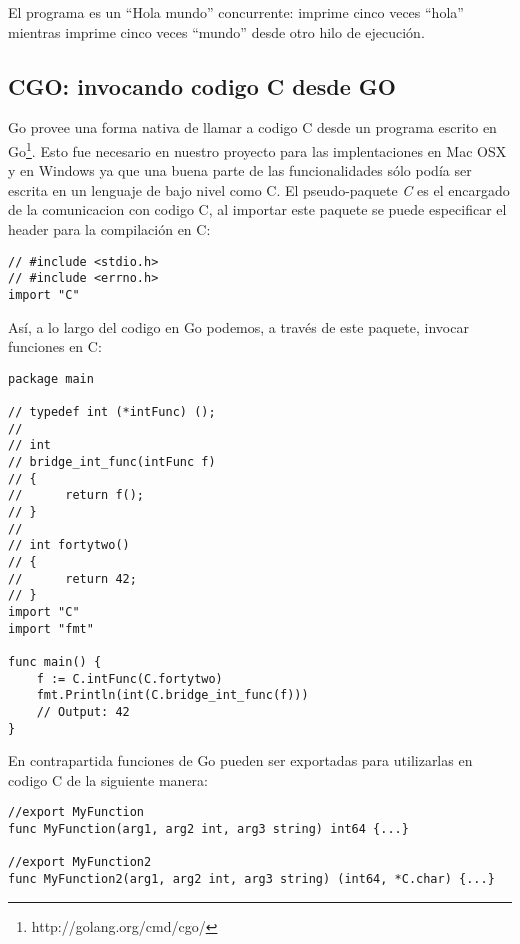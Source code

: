 El programa es un ``Hola mundo'' concurrente: imprime cinco veces ``hola''
mientras imprime cinco veces ``mundo'' desde otro hilo de ejecución.

\subsection{CGO: invocando codigo C desde GO}

Go provee una forma nativa de llamar a codigo C desde un programa escrito en
Go\footnote{http://golang.org/cmd/cgo/}. Esto fue necesario en nuestro proyecto
para las implentaciones en Mac OSX y en Windows ya que una buena parte de las
funcionalidades sólo podía ser escrita en un lenguaje de bajo nivel como C.  El
pseudo-paquete \textit{C} es el encargado de la comunicacion con codigo C, al
importar este paquete se puede especificar el header para la compilación en C:

\begin{verbatim}
// #include <stdio.h>
// #include <errno.h>
import "C"
\end{verbatim}

Así, a lo largo del codigo en Go podemos, a través de este paquete, invocar
funciones en C:

\begin{verbatim}
package main

// typedef int (*intFunc) ();
//
// int
// bridge_int_func(intFunc f)
// {
//		return f();
// }
//
// int fortytwo()
// {
//	    return 42;
// }
import "C"
import "fmt"

func main() {
	f := C.intFunc(C.fortytwo)
	fmt.Println(int(C.bridge_int_func(f)))
	// Output: 42
}
\end{verbatim}

En contrapartida funciones de Go pueden ser exportadas para utilizarlas en
codigo C de la siguiente manera:

\begin{verbatim}
//export MyFunction
func MyFunction(arg1, arg2 int, arg3 string) int64 {...}

//export MyFunction2
func MyFunction2(arg1, arg2 int, arg3 string) (int64, *C.char) {...}
\end{verbatim}
